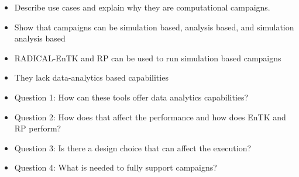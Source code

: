\label{ch:intro}
\begin{itemize}
    \item Describe use cases and explain why they are computational campaigns.
    \item Show that campaigns can be simulation based, analysis based, and simulation analysis based
    \item RADICAL-EnTK and RP can be used to run simulation based campaigns
    \item They lack data-analytics based capabilities
    \item Question 1: How can these tools offer data analytics capabilities?
    \item Question 2: How does that affect the performance and how does EnTK and RP perform?
    \item Question 3: Is there a design choice that can affect the execution?
    \item Question 4: What is needed to fully support campaigns?
\end{itemize}

